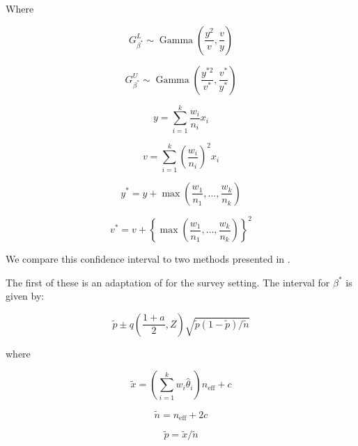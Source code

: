 \documentclass[AMA,STIX1COL]{WileyNJD-v2}
\begin{document}
Where

\begin{equation}
    G_{\beta^*}^L \sim \operatorname{Gamma}\left( \frac{y^2}{v}, \frac{v}{y} \right)
\end{equation}

\begin{equation}
    G_{\beta^*}^U \sim \operatorname{Gamma}\left( \frac{y^{*2}}{v^*}, \frac{v^*}{y^*} \right)
\end{equation}

\begin{equation}
    y = \sum_{i=1}^k \frac{w_i}{n_i} x_i
\end{equation}

\begin{equation}
    v = \sum_{i=1}^k \left( \frac{w_i}{n_i}\right)^2 x_i
\end{equation}

\begin{equation}
    y^* = y + \max\left(\frac{w_1}{n_1}, \ldots, \frac{w_k}{n_k} \right)
\end{equation}

\begin{equation}
    v^* = v + \left\{ \max\left(\frac{w_1}{n_1}, \ldots, \frac{w_k}{n_k} \right) \right\}^2
\end{equation}

We compare this confidence interval to two methods presented in \cite{Dean:2015}.

The first of these is an adaptation of \cite{AgrestiCoull} for the survey setting.
The interval for \( \beta^* \) is given by:

\begin{equation}
    \tilde{p} \pm q\left( \frac{1 + a}{2}, Z \right) \sqrt{\tilde{p}(1 - \tilde{p}) / \tilde{n}}
\end{equation}

where 

\begin{equation}
   \tilde{x} = \left( \sum_{i=1}^k w_i \hat{\theta}_i \right) n_{\text{eff}} + c 
\end{equation}

\begin{equation}
   \tilde{n} = n_{\text{eff}} + 2c 
\end{equation}

\begin{equation}
    \tilde{p} = \tilde{x} / \tilde{n}
\end{equation}
\end{document}

